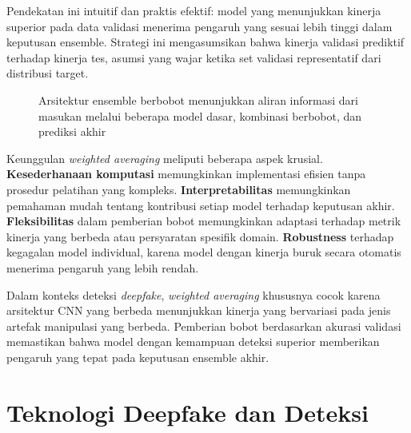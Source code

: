 Pendekatan ini intuitif dan praktis efektif: model yang menunjukkan kinerja superior pada data validasi menerima pengaruh yang sesuai lebih tinggi dalam keputusan ensemble. Strategi ini mengasumsikan bahwa kinerja validasi prediktif terhadap kinerja tes, asumsi yang wajar ketika set validasi representatif dari distribusi target.

\begin{figure}[H]
    \centering
    \caption{Arsitektur ensemble berbobot menunjukkan aliran informasi dari masukan melalui beberapa model dasar, kombinasi berbobot, dan prediksi akhir}
    \label{fig:weighted_ensemble}
\end{figure}

Keunggulan \textit{weighted averaging} meliputi beberapa aspek krusial. \textbf{Kesederhanaan komputasi} memungkinkan implementasi efisien tanpa prosedur pelatihan yang kompleks. \textbf{Interpretabilitas} memungkinkan pemahaman mudah tentang kontribusi setiap model terhadap keputusan akhir. \textbf{Fleksibilitas} dalam pemberian bobot memungkinkan adaptasi terhadap metrik kinerja yang berbeda atau persyaratan spesifik domain. \textbf{Robustness} terhadap kegagalan model individual, karena model dengan kinerja buruk secara otomatis menerima pengaruh yang lebih rendah.

Dalam konteks deteksi \textit{deepfake}, \textit{weighted averaging} khususnya cocok karena arsitektur CNN yang berbeda menunjukkan kinerja yang bervariasi pada jenis artefak manipulasi yang berbeda. Pemberian bobot berdasarkan akurasi validasi memastikan bahwa model dengan kemampuan deteksi superior memberikan pengaruh yang tepat pada keputusan ensemble akhir.

\section{Teknologi Deepfake dan Deteksi}

